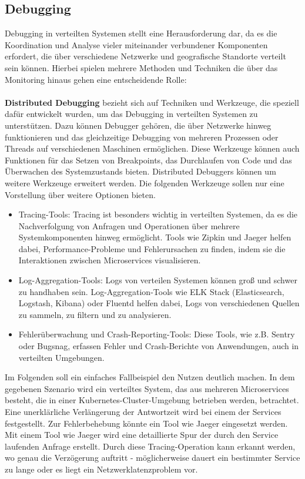 \subsection{Debugging}

Debugging in verteilten Systemen stellt eine Herausforderung dar, da es die Koordination und Analyse vieler miteinander verbundener Komponenten erfordert, die über verschiedene Netzwerke und geografische Standorte verteilt sein können. Hierbei spielen mehrere Methoden und Techniken die über das Monitoring hinaus gehen eine entscheidende Rolle:
\\\\
\textbf{Distributed Debugging} bezieht sich auf Techniken und Werkzeuge, die speziell dafür entwickelt wurden, um das Debugging in verteilten Systemen zu unterstützen. Dazu können Debugger gehören, die über Netzwerke hinweg funktionieren und das gleichzeitige Debugging von mehreren Prozessen oder Threads auf verschiedenen Maschinen ermöglichen. Diese Werkzeuge können auch Funktionen für das Setzen von Breakpoints, das Durchlaufen von Code und das Überwachen des Systemzustands bieten. Distributed Debuggers können um weitere Werkzeuge erweitert werden. Die folgenden Werkzeuge sollen nur eine Vorstellung über weitere Optionen bieten.
\begin{itemize}
\item Tracing-Tools: Tracing ist besonders wichtig in verteilten Systemen, da es die Nachverfolgung von Anfragen und Operationen über mehrere Systemkomponenten hinweg ermöglicht. Tools wie Zipkin und Jaeger helfen dabei, Performance-Probleme und Fehlerursachen zu finden, indem sie die Interaktionen zwischen Microservices visualisieren.
\item Log-Aggregation-Tools: Logs von verteilen Systemen können groß und schwer zu handhaben sein. Log-Aggregation-Tools wie ELK Stack (Elasticsearch, Logstash, Kibana) oder Fluentd helfen dabei, Logs von verschiedenen Quellen zu sammeln, zu filtern und zu analysieren.
\item Fehlerüberwachung und Crash-Reporting-Tools: Diese Tools, wie z.B. Sentry oder Bugsnag, erfassen Fehler und Crash-Berichte von Anwendungen, auch in verteilten Umgebungen.
\end{itemize}
Im Folgenden soll ein einfaches Fallbeispiel den Nutzen deutlich machen. In dem gegebenen Szenario wird ein verteiltes System, das aus mehreren Microservices besteht, die in einer Kubernetes-Cluster-Umgebung betrieben werden, betrachtet. Eine unerklärliche Verlängerung der Antwortzeit wird bei einem der Services festgestellt. Zur Fehlerbehebung könnte ein Tool wie Jaeger eingesetzt werden. Mit einem Tool wie Jaeger wird eine detaillierte Spur der durch den Service laufenden Anfrage erstellt. Durch diese Tracing-Operation kann erkannt werden, wo genau die Verzögerung auftritt - möglicherweise dauert ein bestimmter Service zu lange oder es liegt ein Netzwerklatenzproblem vor.
